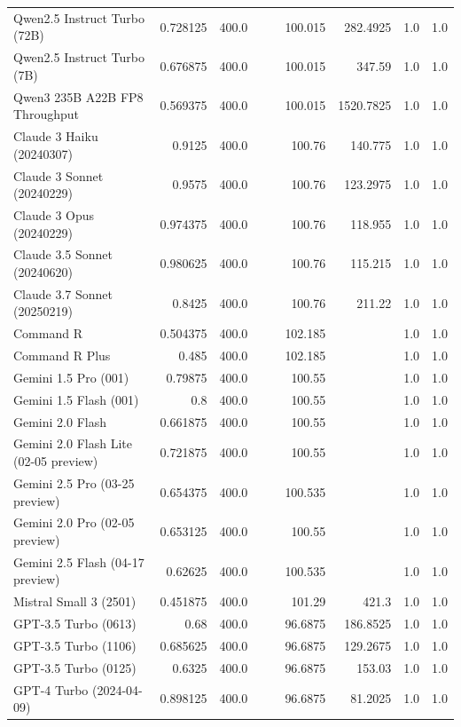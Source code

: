 \begin{table}[htp]
{\begin{tabular}{lrrrrrrrr}
Qwen2.5 Instruct Turbo (72B) & 0.728125 & 400.0 &  &  & 100.015 & 282.4925 & 1.0 & 1.0 \\
Qwen2.5 Instruct Turbo (7B) & 0.676875 & 400.0 &  &  & 100.015 & 347.59 & 1.0 & 1.0 \\
Qwen3 235B A22B FP8 Throughput & 0.569375 & 400.0 &  &  & 100.015 & 1520.7825 & 1.0 & 1.0 \\
Claude 3 Haiku (20240307) & 0.9125 & 400.0 &  &  & 100.76 & 140.775 & 1.0 & 1.0 \\
Claude 3 Sonnet (20240229) & 0.9575 & 400.0 &  &  & 100.76 & 123.2975 & 1.0 & 1.0 \\
Claude 3 Opus (20240229) & 0.974375 & 400.0 &  &  & 100.76 & 118.955 & 1.0 & 1.0 \\
Claude 3.5 Sonnet (20240620) & 0.980625 & 400.0 &  &  & 100.76 & 115.215 & 1.0 & 1.0 \\
Claude 3.7 Sonnet (20250219) & 0.8425 & 400.0 &  &  & 100.76 & 211.22 & 1.0 & 1.0 \\
Command R & 0.504375 & 400.0 &  &  & 102.185 &  & 1.0 & 1.0 \\
Command R Plus & 0.485 & 400.0 &  &  & 102.185 &  & 1.0 & 1.0 \\
Gemini 1.5 Pro (001) & 0.79875 & 400.0 &  &  & 100.55 &  & 1.0 & 1.0 \\
Gemini 1.5 Flash (001) & 0.8 & 400.0 &  &  & 100.55 &  & 1.0 & 1.0 \\
Gemini 2.0 Flash & 0.661875 & 400.0 &  &  & 100.55 &  & 1.0 & 1.0 \\
Gemini 2.0 Flash Lite (02-05 preview) & 0.721875 & 400.0 &  &  & 100.55 &  & 1.0 & 1.0 \\
Gemini 2.5 Pro (03-25 preview) & 0.654375 & 400.0 &  &  & 100.535 &  & 1.0 & 1.0 \\
Gemini 2.0 Pro (02-05 preview) & 0.653125 & 400.0 &  &  & 100.55 &  & 1.0 & 1.0 \\
Gemini 2.5 Flash (04-17 preview) & 0.62625 & 400.0 &  &  & 100.535 &  & 1.0 & 1.0 \\
Mistral Small 3 (2501) & 0.451875 & 400.0 &  &  & 101.29 & 421.3 & 1.0 & 1.0 \\
GPT-3.5 Turbo (0613) & 0.68 & 400.0 &  &  & 96.6875 & 186.8525 & 1.0 & 1.0 \\
GPT-3.5 Turbo (1106) & 0.685625 & 400.0 &  &  & 96.6875 & 129.2675 & 1.0 & 1.0 \\
GPT-3.5 Turbo (0125) & 0.6325 & 400.0 &  &  & 96.6875 & 153.03 & 1.0 & 1.0 \\
GPT-4 Turbo (2024-04-09) & 0.898125 & 400.0 &  &  & 96.6875 & 81.2025 & 1.0 & 1.0 \\

\end{tabular}}
\end{table}
